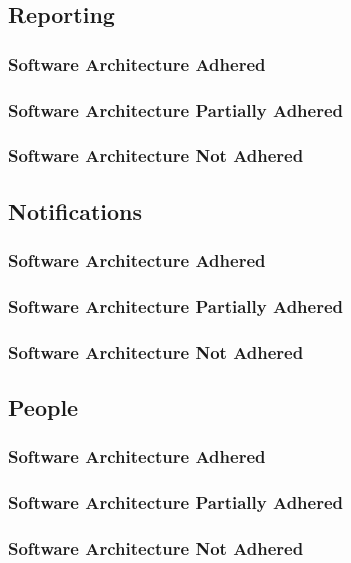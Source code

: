 \documentclass{article}
\begin{document}
	\subsection{Reporting}
		\subsubsection{Software Architecture Adhered}
		\subsubsection{Software Architecture Partially Adhered}
		\subsubsection{Software Architecture Not Adhered}		
		
	\subsection{Notifications}
		\subsubsection{Software Architecture Adhered}
		\subsubsection{Software Architecture Partially Adhered}
		\subsubsection{Software Architecture Not Adhered}		
		
	\subsection{People}
		\subsubsection{Software Architecture Adhered}
		\subsubsection{Software Architecture Partially Adhered}
		\subsubsection{Software Architecture Not Adhered}		
		
\end{document}
